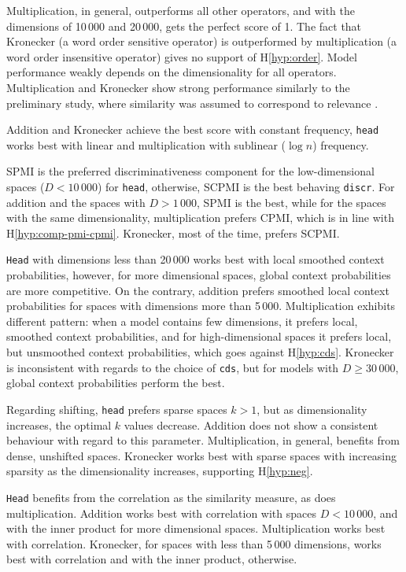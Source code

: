 Multiplication, in general, outperforms all other operators, and with the dimensions of 10\,000 and 20\,000, gets the perfect score of 1. The fact that Kronecker (a word order sensitive operator) is outperformed by multiplication (a word order insensitive operator) gives no support of H\ref{hyp:order}. Model performance weakly depends on the dimensionality for all operators. Multiplication and Kronecker show strong performance similarly to the preliminary study, where similarity was assumed to correspond to relevance \cite{Milajevs:2015:IMN:2808194.2809448}.

Addition and Kronecker achieve the best score with constant frequency, \texttt{head} works best with linear and multiplication with sublinear ($\log n$) frequency.

SPMI is the preferred discriminativeness component for the low-dimensional spaces ($D < 10\,000$) for \texttt{head}, otherwise, SCPMI is the best behaving \texttt{discr}. For addition and the spaces with $D > 1\,000$, SPMI is the best, while for the spaces with the same dimensionality, multiplication prefers CPMI, which is in line with H\ref{hyp:comp-pmi-cpmi}. Kronecker, most of the time, prefers SCPMI.

\texttt{Head} with dimensions less than 20\,000 works best with local smoothed context probabilities, however, for more dimensional spaces, global context probabilities are more competitive. On the contrary, addition prefers smoothed local context probabilities for spaces with dimensions more than 5\,000. Multiplication exhibits different pattern: when a model contains few dimensions, it prefers local, smoothed context probabilities, and for high-dimensional spaces it prefers local, but unsmoothed context probabilities, which goes against H\ref{hyp:cds}. Kronecker is inconsistent with regards to the choice of \texttt{cds}, but for models with $D \geq 30\,000$, global context probabilities perform the best.

Regarding shifting, \texttt{head} prefers sparse spaces $k > 1$, but as dimensionality increases, the optimal $k$ values decrease. Addition does not show a consistent behaviour with regard to this parameter. Multiplication, in general, benefits from dense, unshifted spaces. Kronecker works best with sparse spaces with increasing sparsity as the dimensionality increases, supporting H\ref{hyp:neg}.

\texttt{Head} benefits from the correlation as the similarity measure, as does multiplication. Addition works best with correlation with spaces $D < 10\,000$, and with the inner product for more dimensional spaces. Multiplication works best with correlation. Kronecker, for spaces with less than 5\,000 dimensions, works best with correlation and with the inner product, otherwise.

